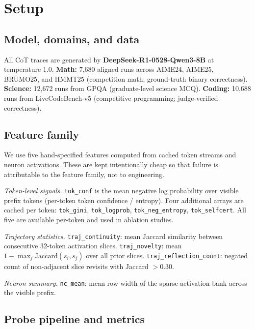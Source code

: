 \documentclass{article}
\begin{document}
\section{Setup}
\label{sec:setup}

\subsection{Model, domains, and data}

All CoT traces are generated by \textbf{DeepSeek-R1-0528-Qwen3-8B} at temperature 1.0.
\textbf{Math:} 7,680 aligned runs across AIME24, AIME25, BRUMO25, and HMMT25 (competition math; ground-truth binary correctness).
\textbf{Science:} 12,672 runs from GPQA (graduate-level science MCQ).
\textbf{Coding:} 10,688 runs from LiveCodeBench-v5 (competitive programming; judge-verified correctness).

\subsection{Feature family}

We use five hand-specified features computed from cached token streams and neuron activations. These are kept intentionally cheap so that failure is attributable to the feature family, not to engineering.

\textit{Token-level signals.} \texttt{tok\_conf} is the mean negative log probability over visible prefix tokens (per-token token confidence / entropy). Four additional arrays are cached per token: \texttt{tok\_gini}, \texttt{tok\_logprob}, \texttt{tok\_neg\_entropy}, \texttt{tok\_selfcert}. All five are available per-token and used in ablation studies.

\textit{Trajectory statistics.} \texttt{traj\_continuity}: mean Jaccard similarity between consecutive 32-token activation slices. \texttt{traj\_novelty}: mean $1 - \max_j \text{Jaccard}(s_i, s_j)$ over all prior slices. \texttt{traj\_reflection\_count}: negated count of non-adjacent slice revisits with Jaccard $> 0.30$.

\textit{Neuron summary.} \texttt{nc\_mean}: mean row width of the sparse activation bank across the visible prefix.

\subsection{Probe pipeline and metrics}
\end{document}

